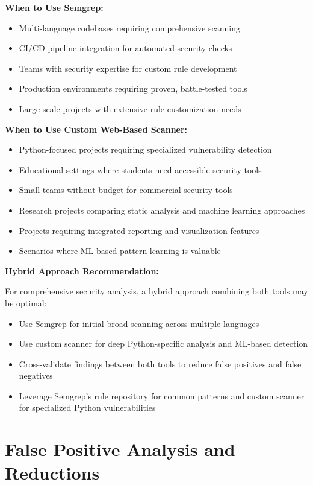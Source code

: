 \textbf{When to Use Semgrep:}
\begin{itemize}
	\item Multi-language codebases requiring comprehensive scanning
	\item CI/CD pipeline integration for automated security checks
	\item Teams with security expertise for custom rule development
	\item Production environments requiring proven, battle-tested tools
	\item Large-scale projects with extensive rule customization needs
\end{itemize}

\textbf{When to Use Custom Web-Based Scanner:}
\begin{itemize}
	\item Python-focused projects requiring specialized vulnerability detection
	\item Educational settings where students need accessible security tools
	\item Small teams without budget for commercial security tools
	\item Research projects comparing static analysis and machine learning approaches
	\item Projects requiring integrated reporting and visualization features
	\item Scenarios where ML-based pattern learning is valuable
\end{itemize}

\textbf{Hybrid Approach Recommendation:}

For comprehensive security analysis, a hybrid approach combining both tools may be optimal:
\begin{itemize}
	\item Use Semgrep for initial broad scanning across multiple languages
	\item Use custom scanner for deep Python-specific analysis and ML-based detection
	\item Cross-validate findings between both tools to reduce false positives and false negatives
	\item Leverage Semgrep's rule repository for common patterns and custom scanner for specialized Python vulnerabilities
\end{itemize}

\section{False Positive Analysis and Reductions}
\label{sec:false_positive_analysis}

